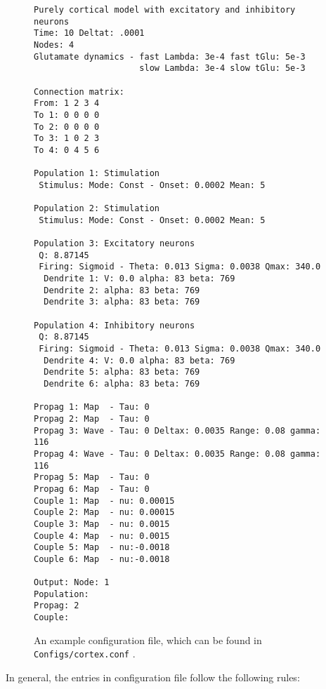 \documentclass[12pt,a4paper]{article}
\newcommand{\type}[1]{ {\small\small\tt #1} }
\begin{document}
\begin{figure}\begin{center}
	\begin{lstlisting}
Purely cortical model with excitatory and inhibitory neurons
Time: 10 Deltat: .0001 
Nodes: 4
Glutamate dynamics - fast Lambda: 3e-4 fast tGlu: 5e-3
                     slow Lambda: 3e-4 slow tGlu: 5e-3

Connection matrix:
From: 1 2 3 4
To 1: 0 0 0 0
To 2: 0 0 0 0
To 3: 1 0 2 3
To 4: 0 4 5 6

Population 1: Stimulation
 Stimulus: Mode: Const - Onset: 0.0002 Mean: 5

Population 2: Stimulation
 Stimulus: Mode: Const - Onset: 0.0002 Mean: 5

Population 3: Excitatory neurons
 Q: 8.87145
 Firing: Sigmoid - Theta: 0.013 Sigma: 0.0038 Qmax: 340.0
  Dendrite 1: V: 0.0 alpha: 83 beta: 769
  Dendrite 2: alpha: 83 beta: 769
  Dendrite 3: alpha: 83 beta: 769

Population 4: Inhibitory neurons
 Q: 8.87145
 Firing: Sigmoid - Theta: 0.013 Sigma: 0.0038 Qmax: 340.0
  Dendrite 4: V: 0.0 alpha: 83 beta: 769
  Dendrite 5: alpha: 83 beta: 769
  Dendrite 6: alpha: 83 beta: 769

Propag 1: Map  - Tau: 0
Propag 2: Map  - Tau: 0
Propag 3: Wave - Tau: 0 Deltax: 0.0035 Range: 0.08 gamma: 116
Propag 4: Wave - Tau: 0 Deltax: 0.0035 Range: 0.08 gamma: 116
Propag 5: Map  - Tau: 0
Propag 6: Map  - Tau: 0
Couple 1: Map  - nu: 0.00015
Couple 2: Map  - nu: 0.00015
Couple 3: Map  - nu: 0.0015
Couple 4: Map  - nu: 0.0015
Couple 5: Map  - nu:-0.0018
Couple 6: Map  - nu:-0.0018

Output: Node: 1
Population: 
Propag: 2
Couple: 
	\end{lstlisting}
\end{center}
\caption{An example configuration file, which can be found in \type{Configs/cortex.conf}.}
\end{figure}

In general, the entries in configuration file follow the following rules:
\end{document}
